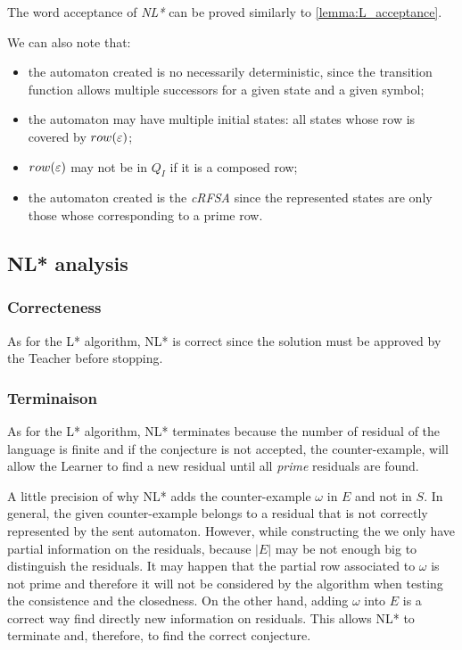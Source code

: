 The word acceptance of \textit{NL*} can be proved similarly to \cref{lemma:L_acceptance}.

We can also note that:
\begin{itemize}
  \item the automaton created is no necessarily deterministic, since the transition function allows multiple successors for a given state and a given symbol;
  \item the automaton may have multiple initial states: all states whose row is covered by $row(\varepsilon)$;
  \item $row(\varepsilon)$ may not be in $Q_I$ if it is a composed row;
  \item the automaton created is the \textit{cRFSA} since the represented states are only those whose corresponding to a prime row.
\end{itemize}


\subsection{NL* analysis}
\subsubsection{Correcteness}
As for the L* algorithm, NL* is correct since the solution must be approved by the Teacher before stopping.

\subsubsection{Terminaison}
As for the L* algorithm, NL* terminates because the number of residual of the language is finite and if the conjecture is not accepted, the counter-example, will allow the Learner to find a new residual until all \textit{prime} residuals are found.

A little precision of why NL* adds the counter-example $\omega$ in $E$ and not in $S$. In general, the given counter-example belongs to a residual that is not correctly represented by the sent automaton. However, while constructing the \OT we only have partial information on the residuals, because $|E|$ may be not enough big to distinguish the residuals. It may happen that the partial row associated to $\omega$ is not prime and therefore it will not be considered by the algorithm when testing the consistence and the closedness. On the other hand, adding $\omega$ into $E$ is a correct way find directly new information on residuals. This allows NL* to terminate and, therefore, to find the correct conjecture.

